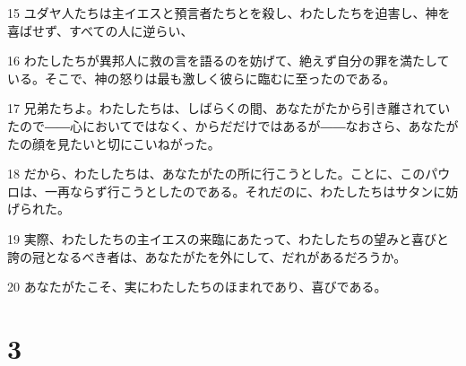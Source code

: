 \par 15 ユダヤ人たちは主イエスと預言者たちとを殺し、わたしたちを迫害し、神を喜ばせず、すべての人に逆らい、
\par 16 わたしたちが異邦人に救の言を語るのを妨げて、絶えず自分の罪を満たしている。そこで、神の怒りは最も激しく彼らに臨むに至ったのである。
\par 17 兄弟たちよ。わたしたちは、しばらくの間、あなたがたから引き離されていたので――心においてではなく、からだだけではあるが――なおさら、あなたがたの顔を見たいと切にこいねがった。
\par 18 だから、わたしたちは、あなたがたの所に行こうとした。ことに、このパウロは、一再ならず行こうとしたのである。それだのに、わたしたちはサタンに妨げられた。
\par 19 実際、わたしたちの主イエスの来臨にあたって、わたしたちの望みと喜びと誇の冠となるべき者は、あなたがたを外にして、だれがあるだろうか。
\par 20 あなたがたこそ、実にわたしたちのほまれであり、喜びである。

\chapter{3}


